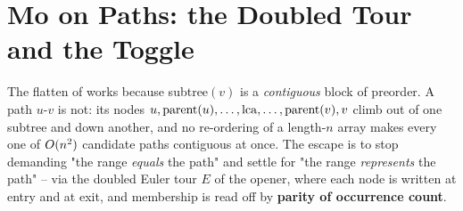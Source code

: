 \section{Mo on Paths: the Doubled Tour and the Toggle}\label{sec:c21-path}

\begin{previouslybox}
The flatten of  works because subtree\((v)\) is a
\emph{contiguous} block of preorder.  A path \(u\)-\(v\) is not: its nodes
\(u, \operatorname{parent}(u), \dots, \operatorname{lca}, \dots, \operatorname{parent}(v), v\) climb out of one subtree
and down another, and no re-ordering of a length-\(n\) array makes every one of
\(O(n^2)\) candidate paths contiguous at once.  The escape is to stop
demanding "the range \emph{equals} the path" and settle for "the range
\emph{represents} the path" -- via the doubled Euler tour \(E\) of the opener,
where each node is written at entry and at exit, and membership is read off by
\textbf{parity of occurrence count}.
\end{previouslybox}

